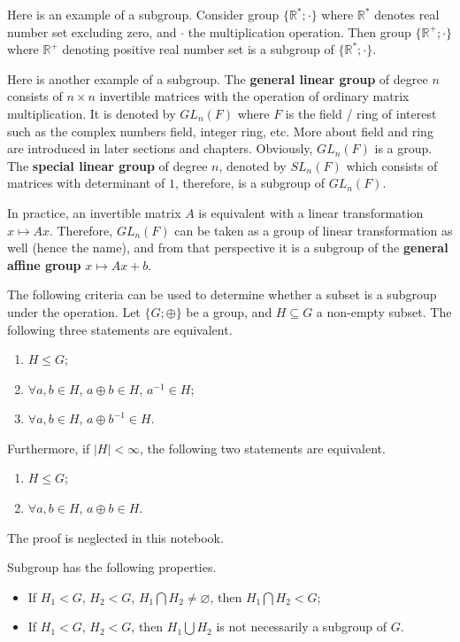 Here is an example of a subgroup. Consider group $\{\mathbb{R}^*; \cdot\}$ where $\mathbb{R}^*$ denotes real number set excluding zero, and $\cdot$ the multiplication operation. Then group $\{\mathbb{R}^+;\cdot\}$ where $\mathbb{R}^+$ denoting positive real number set is a subgroup of  $\{\mathbb{R}^*; \cdot\}$.

Here is another example of a subgroup. The \textbf{general linear group} of degree $n$ consists of $n \times n$ invertible matrices with the operation of ordinary matrix multiplication. It is denoted by $GL_n(F)$ where $F$ is the field / ring of interest such as the complex numbers field, integer ring, etc. More about field and ring are introduced in later sections and chapters. Obviously, $GL_n(F)$ is a group. The \textbf{special linear group} of degree $n$, denoted by $SL_n(F)$ which consists of matrices with determinant of $1$, therefore, is a subgroup of $GL_n(F)$.

In practice, an invertible matrix $A$ is equivalent with a linear transformation $x \mapsto Ax$. Therefore, $GL_n(F)$ can be taken as a group of linear transformation as well (hence the name), and from that perspective it is a subgroup of the \textbf{general affine group} $x \mapsto Ax + b$.

The following criteria can be used to determine whether a subset is a subgroup under the operation. Let $\{G;\oplus\}$ be a group, and $H\subseteq G$ a non-empty subset. The following three statements are equivalent.
\begin{enumerate}[label=(\roman*)]
  \item $H\leq G$;
  \item $\forall a, b\in H$, $a\oplus b \in H$, $a^{-1}\in H$;
  \item $\forall a, b \in H$, $a\oplus b^{-1} \in H$.
\end{enumerate}
Furthermore, if $|H|<\infty$, the following two statements are equivalent.
\begin{enumerate}[label=(\roman*)]
  \item $H\leq G$;
  \item $\forall a, b\in H$, $a\oplus b \in H$.
\end{enumerate}
The proof is neglected in this notebook.


Subgroup has the following properties.  
\begin{itemize}
  \item If $H_1 < G$, $H_2 < G$, $H_1 \bigcap H_2 \neq \varnothing$, then $H_1 \bigcap H_2 < G$;
  \item If $H_1 < G$, $H_2 < G$, then $H_1 \bigcup H_2$ is not necessarily a subgroup of $G$.
\end{itemize}

